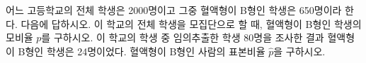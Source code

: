 어느 고등학교의 전체 학생은 2000명이고 그중 혈액형이 B형인 학생은 650명이라 한다. 다음에 답하시오.
 이 학교의 전체 학생을 모집단으로 할 때, 혈액형이 B형인 학생의 모비율 $p$를 구하시오.
 이 학교의 학생 중 임의추출한 학생 80명을 조사한 결과 혈액형이 B형인 학생은 24명이었다. 혈액형이 B형인 사람의 표본비율 $\hat{p}$을 구하시오.

